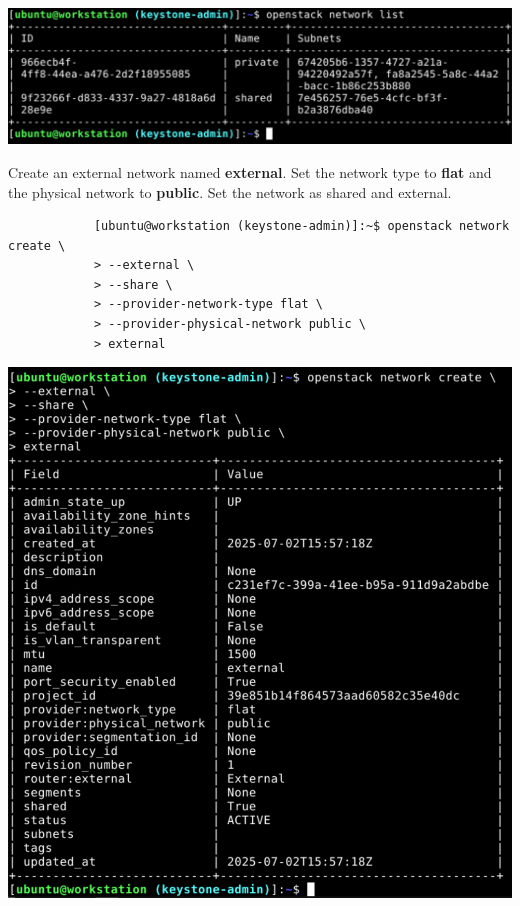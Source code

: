 \documentclass[letterpaper, 12pt]{article}
\begin{document}
\begin{enumerate}
\begin{labstep}
        \begin{center}
            \includegraphics[width=\linewidth]{images/part9/step9.png}
        \end{center}
    \end{labstep}

    \begin{labstep}
        Create an external network named \textbf{external}.
        Set the network type to \textbf{flat} and the physical network to \textbf{public}.
        Set the network as shared and external.
        \begin{lstlisting}
            [ubuntu@workstation (keystone-admin)]:~$ openstack network create \
            > --external \
            > --share \
            > --provider-network-type flat \
            > --provider-physical-network public \
            > external
        \end{lstlisting}

        \begin{center}
            \includegraphics[width=\linewidth]{images/part9/step10.png}
        \end{center}
    \end{labstep}


\end{enumerate}
\end{document}
